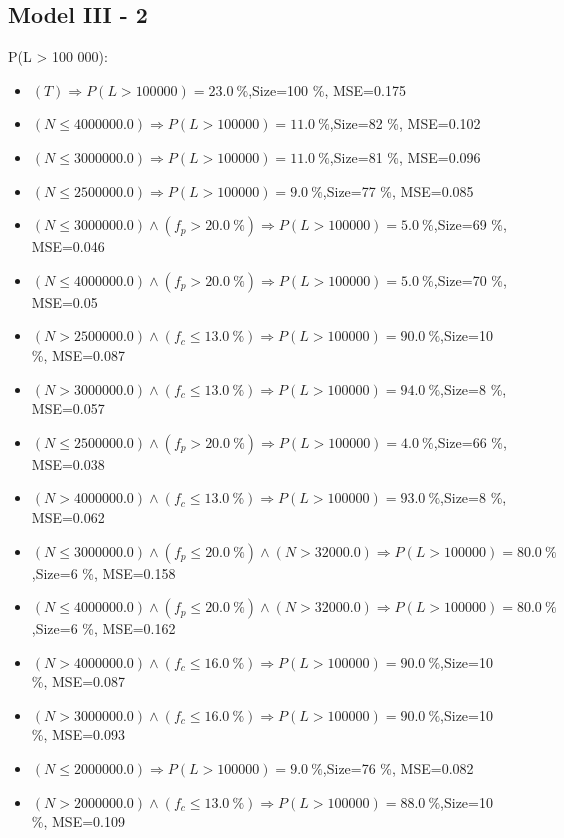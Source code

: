 \documentclass[numbered]{CSL}
\begin{document}
\subsection{Model III - 2}
P(L > 100 000):
\begin{itemize}
\item $(T) \Rightarrow P(L > 100 000) = 23.0~\%$,\hfill Size=100 \%, MSE=0.175
\item $(N \leq 4000000.0) \Rightarrow P(L > 100 000) = 11.0~\%$,\hfill Size=82 \%, MSE=0.102
\item $(N \leq 3000000.0) \Rightarrow P(L > 100 000) = 11.0~\%$,\hfill Size=81 \%, MSE=0.096
\item $(N \leq 2500000.0) \Rightarrow P(L > 100 000) = 9.0~\%$,\hfill Size=77 \%, MSE=0.085
\item $(N \leq 3000000.0) \land (f_p > 20.0~\%) \Rightarrow P(L > 100 000) = 5.0~\%$,\hfill Size=69 \%, MSE=0.046
\item $(N \leq 4000000.0) \land (f_p > 20.0~\%) \Rightarrow P(L > 100 000) = 5.0~\%$,\hfill Size=70 \%, MSE=0.05
\item $(N > 2500000.0) \land (f_c \leq 13.0~\%) \Rightarrow P(L > 100 000) = 90.0~\%$,\hfill Size=10 \%, MSE=0.087
\item $(N > 3000000.0) \land (f_c \leq 13.0~\%) \Rightarrow P(L > 100 000) = 94.0~\%$,\hfill Size=8 \%, MSE=0.057
\item $(N \leq 2500000.0) \land (f_p > 20.0~\%) \Rightarrow P(L > 100 000) = 4.0~\%$,\hfill Size=66 \%, MSE=0.038
\item $(N > 4000000.0) \land (f_c \leq 13.0~\%) \Rightarrow P(L > 100 000) = 93.0~\%$,\hfill Size=8 \%, MSE=0.062
\item $(N \leq 3000000.0) \land (f_p \leq 20.0~\%) \land (N > 32000.0) \Rightarrow P(L > 100 000) = 80.0~\%$,\hfill Size=6 \%, MSE=0.158
\item $(N \leq 4000000.0) \land (f_p \leq 20.0~\%) \land (N > 32000.0) \Rightarrow P(L > 100 000) = 80.0~\%$,\hfill Size=6 \%, MSE=0.162
\item $(N > 4000000.0) \land (f_c \leq 16.0~\%) \Rightarrow P(L > 100 000) = 90.0~\%$,\hfill Size=10 \%, MSE=0.087
\item $(N > 3000000.0) \land (f_c \leq 16.0~\%) \Rightarrow P(L > 100 000) = 90.0~\%$,\hfill Size=10 \%, MSE=0.093
\item $(N \leq 2000000.0) \Rightarrow P(L > 100 000) = 9.0~\%$,\hfill Size=76 \%, MSE=0.082
\item $(N > 2000000.0) \land (f_c \leq 13.0~\%) \Rightarrow P(L > 100 000) = 88.0~\%$,\hfill Size=10 \%, MSE=0.109

\end{itemize}
\end{document}
